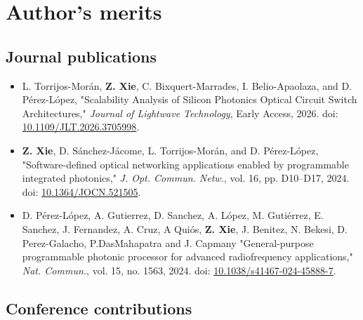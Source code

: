 
\chapter*{Author's merits} \label{sec:merits}

\section*{Journal publications}

\begin{itemize}
  \item L. Torrijos-Morán, \textbf{Z. Xie}, C. Bixquert-Marrades, I. Belio-Apaolaza, and D. Pérez-López, "Scalability Analysis of Silicon Photonics Optical Circuit Switch Architectures," \textit{Journal of Lightwave Technology}, Early Access, 2026. doi: \href{https://ieeexplore.ieee.org/document/11573381}{10.1109/JLT.2026.3705998}.
  \item \textbf{Z. Xie}, D. Sánchez-Jácome, L. Torrijos-Morán, and D. Pérez-López, "Software-defined optical networking applications enabled by programmable integrated photonics," \textit{J. Opt. Commun. Netw.}, vol. 16, pp. D10--D17, 2024. doi: \href{https://doi.org/10.1364/JOCN.521505}{10.1364/JOCN.521505}.
  \item D. Pérez-López, A. Gutierrez, D. Sanchez, A. López, M. Gutiérrez, E. Sanchez, J. Fernandez, A. Cruz, A Quiós,  \textbf{Z. Xie}, J. Benitez, N. Bekesi, D. Perez-Galacho, P.DasMahapatra and J. Capmany "General-purpose programmable photonic processor for advanced radiofrequency applications," \textit{Nat. Commun.}, vol. 15, no. 1563, 2024. doi: \href{https://doi.org/10.1038/s41467-024-45888-7}{10.1038/s41467-024-45888-7}.
\end{itemize}

\section*{Conference contributions}

